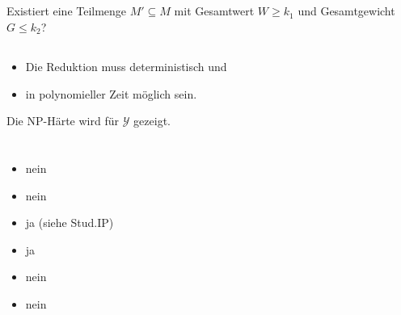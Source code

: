 \documentclass{article}
\begin{document}
\subsection{}%
Existiert eine Teilmenge $M'\subseteq M$ mit Gesamtwert $W \geq k_1$ und Gesamtgewicht $G \leq k_2$?

\subsection{}%
\begin{itemize}
  \item Die Reduktion muss deterministisch und
  \item in polynomieller Zeit möglich sein.
\end{itemize}
Die NP-Härte wird für $\mathcal{Y}$ gezeigt.

\section{}%
\begin{itemize}
	\item nein
  \item nein
  \item ja (siehe Stud.IP)
  \item ja
  \item nein
  \item nein
\end{itemize}
\end{document}
